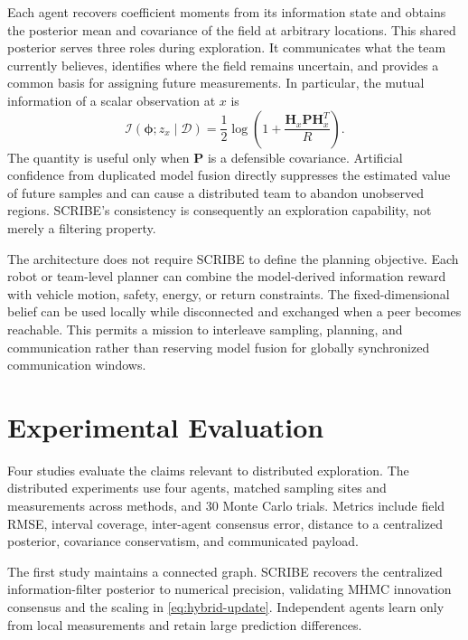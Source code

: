 \documentclass[letterpaper,10pt,conference]{ieeeconf}
\begin{document}
Each agent recovers coefficient moments from its information state and obtains
the posterior mean and covariance of the field at arbitrary locations. This
shared posterior serves three roles during exploration. It communicates what
the team currently believes, identifies where the field remains uncertain,
and provides a common basis for assigning future measurements. In particular,
the mutual information of a scalar observation at $x$ is
\begin{equation}
    \mathcal{I}\left(\bm{\phi};z_x\mid\mathcal{D}\right)
    =\frac{1}{2}\log\left(
        1+\frac{\bm{H}_x\bm{P}\bm{H}_x^T}{R}
    \right).
    \label{eq:mutual-information}
\end{equation}
The quantity is useful only when $\bm{P}$ is a defensible covariance.
Artificial confidence from duplicated model fusion directly suppresses the
estimated value of future samples and can cause a distributed team to abandon
unobserved regions. SCRIBE's consistency is consequently an exploration
capability, not merely a filtering property.

The architecture does not require SCRIBE to define the planning objective.
Each robot or team-level planner can combine the model-derived information
reward with vehicle motion, safety, energy, or return constraints. The
fixed-dimensional belief can be used locally while disconnected and exchanged
when a peer becomes reachable. This permits a mission to interleave sampling,
planning, and communication rather than reserving model fusion for globally
synchronized communication windows.

\section{Experimental Evaluation}

Four studies evaluate the claims relevant to distributed exploration. The
distributed experiments use four agents, matched sampling sites and
measurements across methods, and 30 Monte Carlo trials. Metrics include field
RMSE, interval coverage, inter-agent consensus error, distance to a
centralized posterior, covariance conservatism, and communicated payload.

The first study maintains a connected graph. SCRIBE recovers the centralized
information-filter posterior to numerical precision, validating MHMC
innovation consensus and the scaling in
\eqref{eq:hybrid-update}. Independent agents learn only from local
measurements and retain large prediction differences.
\end{document}

